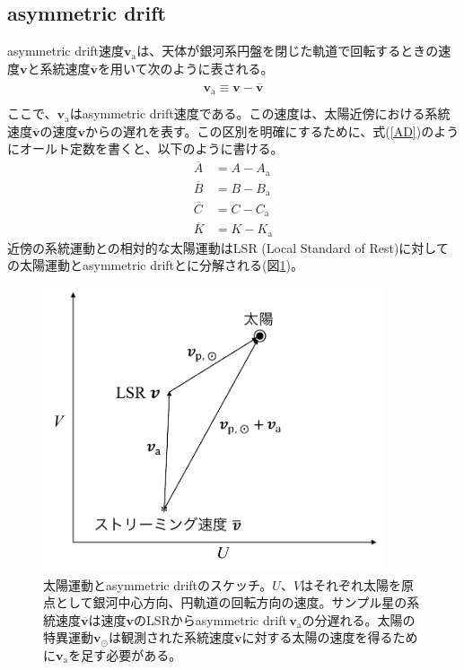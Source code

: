 \subsection{asymmetric drift \label{sec_AD}} %
asymmetric drift速度$\pmb{v}_{\mathrm{a}}$は、天体が銀河系円盤を閉じた軌道で回転するときの速度$\pmb{v}$と系統速度$\overline{\pmb{v}}$を用いて次のように表される。
\begin{align}
\begin{aligned}
    \pmb{v}_{\mathrm{a}} \equiv \pmb{v}- \overline{\pmb{v}}\\
\end{aligned} \label{AD}
\end{align}
ここで、$\pmb{v}_{\mathrm{a}}$はasymmetric drift速度である。この速度は、太陽近傍における系統速度$\overline{\pmb{v}}$の速度$\pmb{v}$からの遅れを表す。この区別を明確にするために、式(\ref{AD})のようにオールト定数を書くと、以下のように書ける。
\begin{subequations}
\begin{align}
	\overline{A} &= A - A_{\mathrm{a}} \\
	\overline{B} &= B - B_{\mathrm{a}} \\
	\overline{C} &= C - C_{\mathrm{a}} \\
	\overline{K} &= K - K_{\mathrm{a}}
\end{align}
\end{subequations}
近傍の系統運動との相対的な太陽運動はLSR (Local Standard of Rest)に対しての太陽運動とasymmetric driftとに分解される(図\ref{fig1})。

\begin{figure}[htbp]
\begin{center}
	\includegraphics[width=10cm]{fig/various_velocities.pdf}
	\caption{太陽運動とasymmetric driftのスケッチ。$U、V$はそれぞれ太陽を原点として銀河中心方向、円軌道の回転方向の速度。サンプル星の系統速度$\pmb{\overline{v}}$は速度$\pmb{v}$のLSRからasymmetric drift\,$\pmb{v}_{\mathrm{a}}$の分遅れる。太陽の特異運動$\pmb{v}_{\odot}$は観測された系統速度$\pmb{\overline{v}}$に対する太陽の速度を得るために$\pmb{v}_{\mathrm{a}}$を足す必要がある。}
	\label{fig1}
\end{center}
\end{figure}

